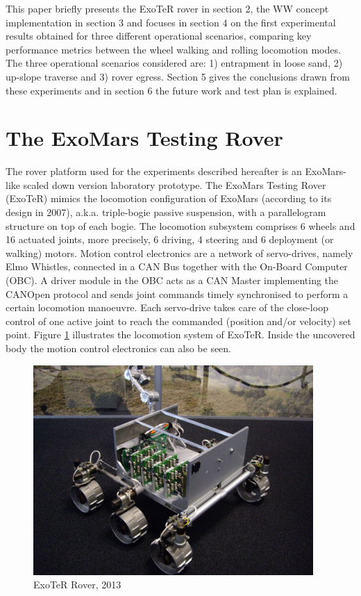\documentclass[a4paper,twocolumn]{esapub2005} %
\begin{document}
This paper briefly presents the ExoTeR rover in section 2, the WW
concept implementation in section 3 and focuses in
section 4 on the first experimental results obtained for three different
operational scenarios, comparing key performance metrics between the wheel
walking and rolling locomotion modes. The three operational scenarios
considered are: 1) entrapment in loose sand, 2) up-slope traverse and 3) rover
egress. Section 5 gives the conclusions drawn from these experiments and in
section 6 the future work and test plan is explained.

\section{The ExoMars Testing Rover}

The rover platform used for the experiments described hereafter is an
ExoMars-like scaled down version laboratory prototype. The ExoMars Testing
Rover (ExoTeR) mimics the locomotion configuration of
ExoMars (according to its design in 2007), a.k.a. triple-bogie passive
suspension, with a parallelogram structure on top of each bogie. The locomotion
subsystem comprises 6 wheels and 16 actuated joints, more precisely, 6 driving,
4 steering and 6 deployment (or walking) motors.  Motion control electronics
are a network of servo-drives, namely Elmo Whistles, connected in a CAN Bus
together with the On-Board Computer (OBC). A driver module in the OBC acts as a CAN
Master implementing the CANOpen protocol and sends joint commands timely
synchronised to perform a certain locomotion manoeuvre. Each servo-drive takes
care of the close-loop control of one active joint to reach the commanded
(position and/or velocity) set point.  Figure \ref{fig:ExoterRover2013} illustrates the locomotion
system of ExoTeR. Inside the uncovered body the motion control electronics can
also be seen.

\begin{figure}[h!]
    \centering
    \includegraphics[width=0.95\textwidth]{ExoterRover2013.jpg}
    \caption{ExoTeR Rover, 2013}
    \label{fig:ExoterRover2013}
\end{figure}
\end{document}
